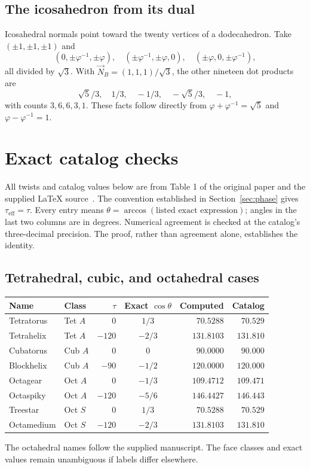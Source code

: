\documentclass[11pt,letterpaper]{article}
\newcommand{\NB}{\vec N_B}
\newcommand{\eff}{\tau_{\mathrm{eff}}}
\begin{document}
\subsection{The icosahedron from its dual}
Icosahedral normals point toward the twenty vertices of a dodecahedron.
Take $(\pm1,\pm1,\pm1)$ and
\[
 (0,\pm\varphi^{-1},\pm\varphi),\quad
 (\pm\varphi^{-1},\pm\varphi,0),\quad
 (\pm\varphi,0,\pm\varphi^{-1}),
\]
all divided by $\sqrt3$. With $\NB=(1,1,1)/\sqrt3$,
the other nineteen dot products are
\[
 \sqrt5/3,\quad 1/3,\quad -1/3,\quad -\sqrt5/3,\quad -1,
\]
with counts $3,6,6,3,1$.
These facts follow directly from $\varphi+\varphi^{-1}=\sqrt5$ and
$\varphi-\varphi^{-1}=1$.

\newpage
\section{Exact catalog checks}\label{sec:catalog}
All twists and catalog values below are from Table 1 of the original
paper and the supplied LaTeX source~\cite{read2022,repository}.
The convention established in Section~\ref{sec:phase} gives $\eff=\tau$.
Every entry means $\theta=\arccos(\text{listed exact expression})$;
angles in the last two columns are in degrees. Numerical agreement is
checked at the catalog's three-decimal precision. The proof, rather than
agreement alone, establishes the identity.

\subsection{Tetrahedral, cubic, and octahedral cases}
\begin{center}\small
\setlength{\tabcolsep}{5pt}
\begin{tabular}{llrcrr}
\toprule
Name & Class & $\tau$ & Exact $\cos\theta$ & Computed & Catalog\\
\midrule
Tetratorus & Tet $A$ & $0$ & $1/3$ & $70.5288$ & $70.529$\\
Tetrahelix & Tet $A$ & $-120$ & $-2/3$ & $131.8103$ & $131.810$\\
\addlinespace
Cubatorus & Cub $A$ & $0$ & $0$ & $90.0000$ & $90.000$\\
Blockhelix & Cub $A$ & $-90$ & $-1/2$ & $120.0000$ & $120.000$\\
\addlinespace
Octagear & Oct $A$ & $0$ & $-1/3$ & $109.4712$ & $109.471$\\
Octaspiky & Oct $A$ & $-120$ & $-5/6$ & $146.4427$ & $146.443$\\
Treestar & Oct $S$ & $0$ & $1/3$ & $70.5288$ & $70.529$\\
Octamedium & Oct $S$ & $-120$ & $-2/3$ & $131.8103$ & $131.810$\\
\bottomrule
\end{tabular}
\end{center}
The octahedral names follow the supplied manuscript. The face classes
and exact values remain unambiguous if labels differ elsewhere.
\end{document}
